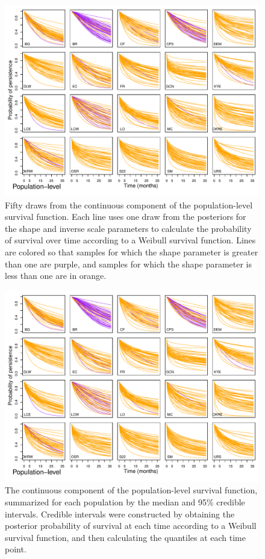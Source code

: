 \documentclass[12pt, oneside]{article}   	%
\begin{document}
 \begin{figure}[!h]
   \centering
       \includegraphics[page=1,width=1\textwidth]{../../figures/survival-function-population.pdf}  
    \caption{ Fifty draws from the continuous component of the population-level survival function. Each line uses one draw from the posteriors for the shape and inverse scale parameters to calculate the probability of survival  over time according to a Weibull survival function. Lines are colored so that samples for which the shape parameter is greater than one are purple, and samples for which the shape parameter is less than one are in orange.    }
 \label{fig:viability-estimates-population}
\end{figure}

 \begin{figure}[!h]
   \centering
       \includegraphics[page=2,width=1\textwidth]{../../figures/survival-function-population.pdf}  
    \caption{ The continuous component of the population-level survival function, summarized for each population by the median and 95\% credible intervals. Credible intervals were constructed by obtaining the posterior probability of survival at each time according to a Weibull survival function, and then calculating the quantiles at each time point.  }
 \label{fig:viability-estimates-population}
\end{figure}
\end{document}
